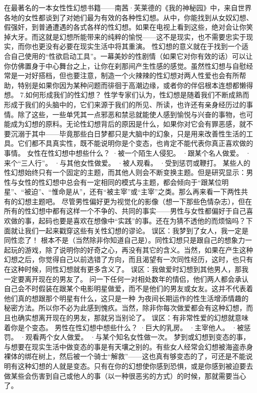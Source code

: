 \documentclass[12pt,UTF8]{ctexbook}
\begin{document}
在最著名的一本女性性幻想书籍——南茜·芙莱德的《我的神秘园》中，来自世界各地的女性都谈到了对她们最为有效的各种性幻想。从中，你能找到从女奴幻想、假强奸，到普通遭遇的各式各样的性幻想。如果在电视上看到这些，绝对会让你笑掉大牙。而这就是幻想所能带来的纯粹的愉悦——这不是现实，也不需要忠实于现实，而你也更没有必要在现实生活中将其重演。
性幻想的意义就在于找到一个适合自己使用的“性欲启动工具”。一幕美妙的性剧情（如果它对你有效的话）可以让你仿佛置身于中心舞台之上，让你在刹那间产生性感的感觉。虽然性幻想与自慰经常是一对好搭档，但也要注意，制造一个火辣辣的性幻想对两人性爱也会有所帮助，特别是如果你因为某种问题而徘徊于高潮边缘，或者你的伴侣根本连想都懒得想。
7.如何形成我们的性幻想？
性学专家们认为，性幻想是随着我们不断成熟而形成于我们的头脑中的，它们来源于我们的所见、所读，也许还有亲身经历过的事情。除了这些，一些单凭其一点邪恶和禁忌就能使人感到愉悦与兴奋的事物，也可能成为幻想的原料。无论性幻想背后的原因是什么，如果你对它会有罪恶感，就不要沉溺于其中——毕竟那些白日梦都只是大脑中的幻象，只是用来改善性生活的工具。它们都不具真实性，既不能说明你是个变态，也肯定不能代表你真正喜欢做的事情。
女性在性幻想中想些什么？
·被一个陌生人侵犯。
·跟某个名人做爱。
·来个“三人行”。
·与其他女性做爱。
·被人观看。
·受到惩罚或鞭打。
某些人的性幻想始终只有一个固定的主题，而其他人则会不断变换主题。但是研究显示：男性与女性的性幻想中总会有一定相同的模式与主题，都会倾向于“跟某位明星”、“被迫”、“惟命是从”，还有“被主宰”或“主宰”之类。那么再来看一下两性共有的幻想主题吧。
尽管男性偏好更为视觉化的影像（想一下那些色情杂志），但在所有的性幻想中都有这样一个不争的、共同的事实——男性与女性都偏好于自己喜欢做的事，起码也要是喜欢在想像中“实践”的事。还在为猜不透他的而烦恼吗？下面就让我们一起来戳穿这些有关性幻想的谬论。
误区：我梦到了女人，我一定是同性恋了！
根本不是（当然除非你知道自己是）。同性幻想只是跟自己的想象力一起玩的游戏，除了说明你的好奇之心，再没有其它的含义。当然，如果在产生这种幻想之后，你觉得自己以前选错了方向，而且渴望有一次同性经历，这时，也只有在这种时候，同性幻想就有更多含义了。
误区：我做爱时幻想到其他男人，那我一定要离开现在的男友了。
问一下任何一对相处数年的情侣，他们两人都会承认自己会不时假装在跟某个电影明星做爱，而不是他们的男友或女友。这并不代表着他们真的想跟那个明星有什么，这只是一种
为夜间长期运作的性生活增添情趣的秘密方法。所以你不必为此感到愧疚。当然，除非你每次做爱都会有这种幻想，而且也确实想离开现在的男友，那就另当别论了。
误区：有非常性爱的幻想就意味着你是个变态。
男性在性幻想中想些什么？
·巨大的乳房。
·主宰他人。
·被惩罚。
·观看两个女人做爱。
·与某个知名女性做一次。
梦到或幻想到变态的事，与想要在现实生活中做变态的事是有天壤之别的。有些女人经常会幻想被海盗赤身裸体的绑在树上，然后被一个骑士“解救”——这也真有够变态的了，可还是不能说明有这种幻想的人就是变态。只有在你的幻想使你感到恐惧，或是你感到被迫要去做某些会伤害到自己或他人的事（以一种很恶劣的方式）的时候，那就需要当心了。
\end{document}
